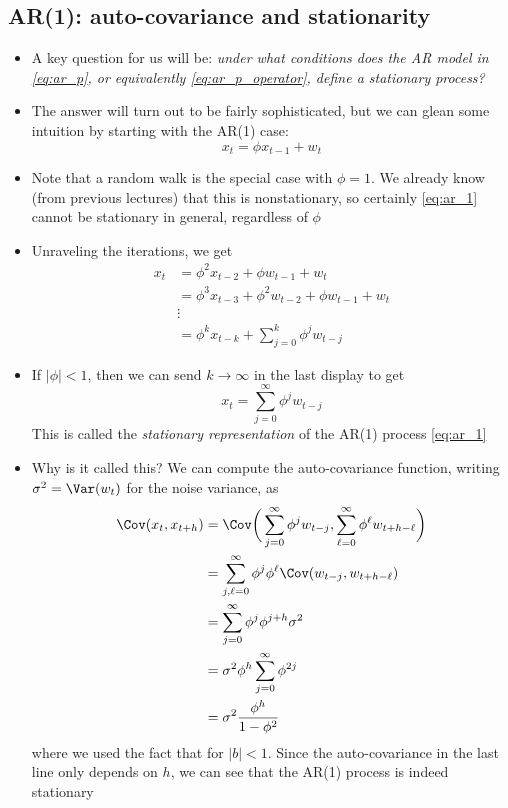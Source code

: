 \documentclass{article}
\begin{document}
\subsection{AR(1): auto-covariance and stationarity}

\begin{itemize}
\item A key question for us will be: \emph{under what conditions does the AR
    model  in \eqref{eq:ar_p}, or equivalently \eqref{eq:ar_p_operator}, define
    a stationary process?} 

\item The answer will turn out to be fairly sophisticated, but we can glean some
  intuition by starting with the AR(1) case: 
  \begin{equation}
  \label{eq:ar_1}
  x_t = \phi x_{t-1} + w_t 
  \end{equation}

\item Note that a random walk is the special case with $\phi = 1$. We already
  know (from previous lectures) that this is nonstationary, so certainly
  \eqref{eq:ar_1} cannot be stationary in general, regardless of $\phi$ 

\item Unraveling the iterations, we get
  \begin{align*}
  x_t &= \phi^2 x_{t-2} + \phi w_{t-1} + w_t \\
  &= \phi^3 x_{t-3} + \phi^2 w_{t-2} + \phi w_{t-1} + w_t \\  
  &\vdots \\ 
  &= \phi^k x_{t-k} + \sum_{j=0}^k \phi^j w_{t-j} 
  \end{align*}

\item If $|\phi| < 1$, then we can send $k \to \infty$ in the last display to 
  get 
  \begin{equation}
  \label{eq:ar_1_stationary}
  x_t = \sum_{j=0}^\infty \phi^j w_{t-j} 
  \end{equation}
  This is called the \emph{stationary representation} of the AR(1) process
  \eqref{eq:ar_1} 

\item Why is it called this? We can compute the auto-covariance function,
  writing $\sigma^2 = \Var(w_t)$ for the noise variance, as
  \begin{align}
  \nonumber
  \Cov(x_t, x_{t+h}) &= \Cov\bigg( \sum_{j=0}^\infty \phi^j w_{t-j}, 
  \sum_{\ell=0}^\infty \phi^\ell w_{t+h-\ell} \bigg) \\
  \nonumber
  &= \sum_{j,\ell=0}^\infty \phi^j \phi^\ell \Cov( w_{t-j}, w_{t+h-\ell} ) \\ 
  \nonumber
  &= \sum_{j=0}^\infty \phi^j \phi^{j+h} \sigma^2 \\
  \nonumber
  &= \sigma^2 \phi^h \sum_{j=0}^\infty \phi^{2j} \\
  \label{eq:ar_1_auto_cov}
  &= \sigma^2 \frac{\phi^h}{1 - \phi^2}    
  \end{align}
  where we used the fact that  for $|b|
  < 1$. Since the auto-covariance in the last line only depends on $h$, we can
  see that the AR(1) process is indeed stationary


\end{itemize}
\end{document}
